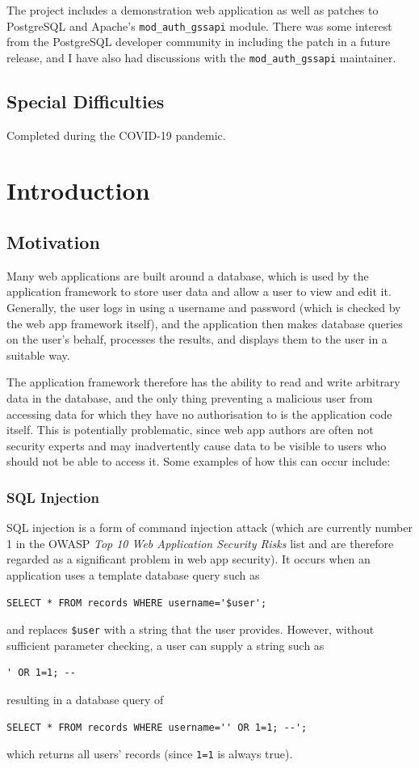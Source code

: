 \documentclass[12pt]{report}
\begin{document}
The project includes a demonstration web application as well as patches to PostgreSQL and Apache's \verb+mod_auth_gssapi+ module. There was some interest from the PostgreSQL developer community in including the patch in a future release, and I have also had discussions with the \verb+mod_auth_gssapi+ maintainer.

\section*{Special Difficulties}
Completed during the COVID-19 pandemic.

\tableofcontents

\chapter{Introduction}

\section{Motivation}
\label{sec:motivation}
Many web applications are built around a database, which is used by the application framework to store user data and allow a user to view and edit it. Generally, the user logs in using a username and password (which is checked by the web app framework itself), and the application then makes database queries on the user's behalf, processes the results, and displays them to the user in a suitable way.

The application framework therefore has the ability to read and write arbitrary data in the database, and the only thing preventing a malicious user from accessing data for which they have no authorisation to is the application code itself. This is potentially problematic, since web app authors are often not security experts and may inadvertently cause data to be visible to users who should not be able to access it. Some examples of how this can occur include:

\subsection{SQL Injection}
\label{sec:sql_injection}
SQL injection is a form of command injection attack (which are currently number 1 in the OWASP \textit{Top 10 Web Application Security Risks} list\cite{OWASP10} and are therefore regarded as a significant problem in web app security). It occurs when an application uses a template database query such as
\begin{verbatim}
SELECT * FROM records WHERE username='$user';
\end{verbatim}
and replaces \verb+$user+ with a string that the user provides. However, without sufficient parameter checking, a user can supply a string such as
\begin{verbatim}
' OR 1=1; --
\end{verbatim}
resulting in a database query of
\begin{verbatim}
SELECT * FROM records WHERE username='' OR 1=1; --';
\end{verbatim}
which returns all users' records (since \verb+1=1+ is always true).
\end{document}
